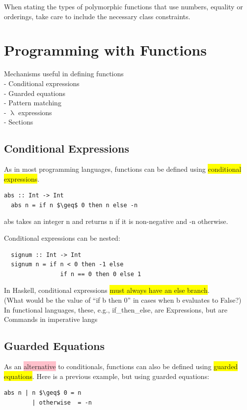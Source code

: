 \documentclass[tikz,border=10pt]{project_plan}
\begin{document}
When stating the types of polymorphic functions
that use numbers, equality or orderings, take
care to include the necessary class constraints.


\section{Programming with Functions}
Mechanisms useful in defining functions\\
- Conditional expressions\\
- Guarded equations\\
- Pattern matching\\
- $\uplambda$ expressions\\
- Sections

\subsection{Conditional Expressions}

As in most programming languages, functions can be
defined using \colorbox{yellow}{conditional expressions}.
\begin{lstlisting}[mathescape]
  abs :: Int -> Int
  abs n = if n $\geq$ 0 then n else -n
\end{lstlisting}
abs takes an integer n and returns n if it is
non-negative and -n otherwise.

Conditional expressions can be nested:
\begin{lstlisting}
  signum :: Int -> Int
  signum n = if n < 0 then -1 else
                if n == 0 then 0 else 1
\end{lstlisting}

In Haskell, conditional expressions \colorbox{yellow}{must always have an
  else branch}.\\
(What would be the value of “if b then 0”
in cases when b evaluates to False?)\\
In functional languages, these, e.g., if\_then\_else, are
Expressions, but are  Commands in imperative langs

\subsection{Guarded Equations}

As an \colorbox{pink}{alternative} to conditionals, functions can also be
defined using \colorbox{yellow}{guarded equations}. Here is a previous
example, but using guarded equations:
\begin{lstlisting}[mathescape]
  abs n | n $\geq$ 0 = n
        | otherwise  = -n
\end{lstlisting}
\end{document}
